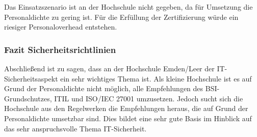 Das Einsatzszenario ist an der Hochschule nicht gegeben, da für Umsetzung die Personaldichte zu gering ist. Für die Erfüllung der Zertifizierung würde ein riesiger Personaloverhead entstehen.

\subsubsection{Fazit Sicherheitsrichtlinien}
Abschließend ist zu sagen, dass an der Hochschule Emden/Leer der IT-Sicherheitsaspekt ein sehr wichtiges Thema ist. Als kleine Hochschule ist es auf Grund der Personaldichte nicht möglich, alle Empfehlungen des BSI-Grundschutzes, ITIL und ISO/IEC 27001 umzusetzen. Jedoch sucht sich die Hochschule aus den Regelwerken die Empfehlungen heraus, die auf Grund der Personaldichte umsetzbar sind. Dies bildet eine sehr gute Basis im Hinblick auf das sehr anspruchsvolle Thema IT-Sicherheit.


